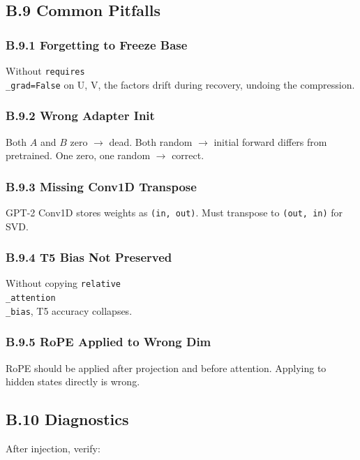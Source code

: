 \subsection{B.9 Common Pitfalls}

\subsubsection{B.9.1 Forgetting to Freeze Base}

Without \texttt{requires\\_grad=False} on U, V, the factors drift during recovery, 
undoing the compression.

\subsubsection{B.9.2 Wrong Adapter Init}

Both $A$ and $B$ zero $\to$ dead. Both random $\to$ initial forward differs from 
pretrained. One zero, one random $\to$ correct.

\subsubsection{B.9.3 Missing Conv1D Transpose}

GPT-2 Conv1D stores weights as \texttt{(in, out)}. Must transpose to \texttt{(out, in)} 
for SVD.

\subsubsection{B.9.4 T5 Bias Not Preserved}

Without copying \texttt{relative\\_attention\\_bias}, T5 accuracy collapses.

\subsubsection{B.9.5 RoPE Applied to Wrong Dim}

RoPE should be applied after projection and before attention. Applying to 
hidden states directly is wrong.

\subsection{B.10 Diagnostics}

After injection, verify:

